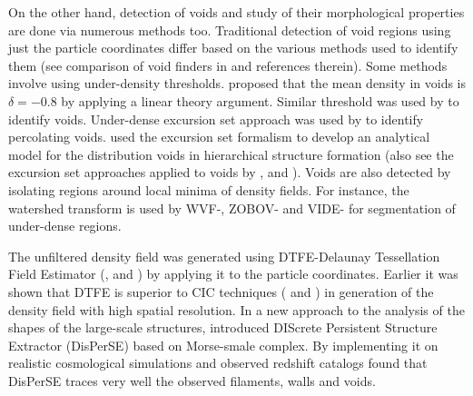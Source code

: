 On the other hand, detection of voids and study of their morphological properties are done via numerous methods too. Traditional detection of void regions using just the particle coordinates differ based on the various methods used to identify them (see comparison of void finders in \citealt{Colberg2008} and references therein). Some methods involve using under-density thresholds. \cite{Blumenthal1992} proposed that the mean density in voids is $\delta = -0.8$ by applying a linear theory argument. Similar threshold was used by \cite{Colberg2005} to identify voids. Under-dense excursion set approach was used by \cite{Shandarin2006} to identify percolating voids. \cite{Sheth2003b} used the excursion set formalism to develop an analytical model for the distribution voids in hierarchical structure formation (also see the excursion set approaches applied to voids by \citealt{Paranjape2012}, \citealt{Jennings2013} and \citealt{Achitouv2015}). Voids are also detected by isolating regions around local minima of density fields. For instance, the watershed transform is used by WVF-\cite{Platen2007},  ZOBOV-\cite{Neyrinck2008} and VIDE-\cite{Sutter2015} for segmentation of under-dense regions. 


The unfiltered density field was generated using DTFE-Delaunay Tessellation Field Estimator (\citealt{Schaap2000}, \citealt{Weygaert2009a} and \citealt{Cautun2011b}) by applying it to the particle coordinates. Earlier it was shown that DTFE is superior to CIC techniques (\citealt{Schaap2007} and \citealt{Weygaert2009a}) in generation of the density field with high spatial resolution. In a new approach to the analysis of the shapes of the large-scale structures, \cite{Sousbie2011f} introduced DIScrete Persistent Structure Extractor ({DisPerSE}) based on Morse-smale complex. By implementing it on realistic cosmological simulations and observed redshift catalogs \cite{Sousbie2011e} found that DisPerSE traces very well the observed filaments, walls and voids.

